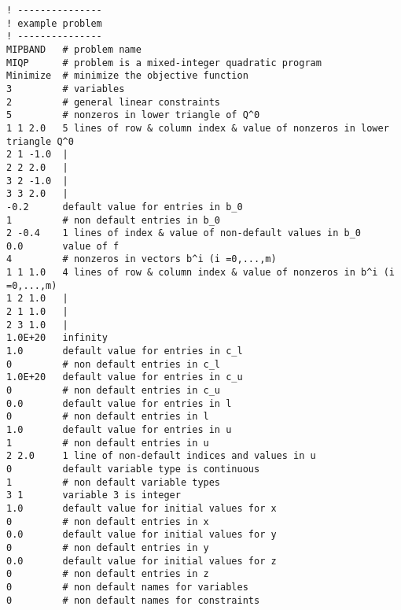 {\small
\begin{verbatim}
! ---------------
! example problem
! ---------------
MIPBAND   # problem name
MIQP      # problem is a mixed-integer quadratic program
Minimize  # minimize the objective function
3         # variables
2         # general linear constraints
5         # nonzeros in lower triangle of Q^0
1 1 2.0   5 lines of row & column index & value of nonzeros in lower triangle Q^0
2 1 -1.0  |
2 2 2.0   |
3 2 -1.0  |
3 3 2.0   |
-0.2      default value for entries in b_0
1         # non default entries in b_0
2 -0.4    1 lines of index & value of non-default values in b_0
0.0       value of f
4         # nonzeros in vectors b^i (i =0,...,m)
1 1 1.0   4 lines of row & column index & value of nonzeros in b^i (i =0,...,m)
1 2 1.0   |
2 1 1.0   |
2 3 1.0   |
1.0E+20   infinity
1.0       default value for entries in c_l
0         # non default entries in c_l
1.0E+20   default value for entries in c_u
0         # non default entries in c_u
0.0       default value for entries in l
0         # non default entries in l
1.0       default value for entries in u
1         # non default entries in u
2 2.0     1 line of non-default indices and values in u
0         default variable type is continuous
1         # non default variable types
3 1       variable 3 is integer
1.0       default value for initial values for x
0         # non default entries in x
0.0       default value for initial values for y
0         # non default entries in y
0.0       default value for initial values for z
0         # non default entries in z
0         # non default names for variables
0         # non default names for constraints
\end{verbatim}
}



